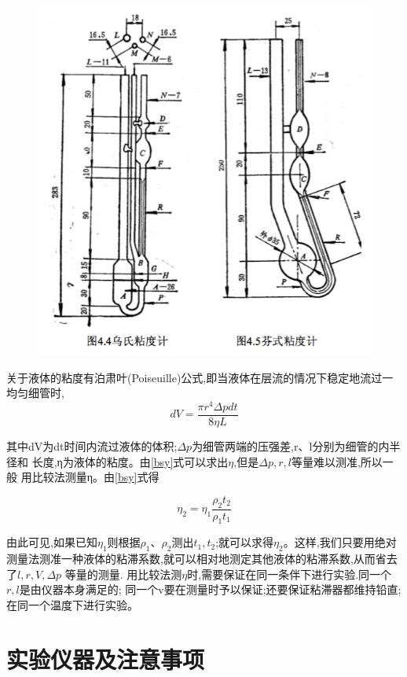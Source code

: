 \documentclass[12pt,a4paper]{ctexart}
\makeatletter
\def\maxwidth{\ifdim\Gin@nat@width>\linewidth\linewidth
\else\Gin@nat@width\fi}
\let\Oldincludegraphics\includegraphics
\renewcommand{\includegraphics}[1]{\Oldincludegraphics[width=\maxwidth]{#1}}
\makeatother
\begin{document}
\begin{figure}[htbp]
\centering
\includegraphics{media/14505376007114/14505415924880.jpg}
\caption{}
\end{figure}

关于液体的粘度有泊肃叶(Poiseuille)公式,即当液体在层流的情况下稳定地流过一均匀细管时,
\begin{equation}
d V={\frac {\pi r^{4}\Delta pdt}{8\eta L }}
\label{bsy}
\end{equation}


其中dV为dt时间内流过液体的体积;\(\Delta p\)为细管两端的压强差,r、l分别为细管的内半径和
长度,η为液体的粘度。由\ref{bsy}式可以求出\(\eta\),但是\(\Delta p,r,l\)等量难以测准,所以一般
用比较法测量η。由\ref{bsy}式得

\[\eta_2=\eta_1\frac{\rho_2t_2}{\rho_1 t_1}\]

由此可见,如果已知\(\eta_1\)则根据\(\rho_1、\rho_2\)测出$t_1,t_2$;就可以求得\(\eta_2\)。这样,我们只要用绝对测量法测准一种液体的粘滞系数,就可以相对地测定其他液体的粘滞系数,从而省去
了\(l,r,V,\Delta p\) 等量的测量.
用比较法测\(\eta\)时,需要保证在同一条伴下进行实验.同一个\(r,l\)是由仪器本身满足的;
同一个v要在测量时予以保证;还要保证粘滞器都维持铅直;在同一个温度下进行实验。

\section{实验仪器及注意事项}
\end{document}
